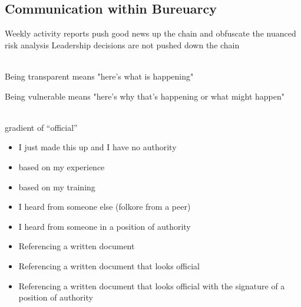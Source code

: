 \subsection{Communication within Bureuarcy}

Weekly activity reports push good news up the chain and obfuscate the nuanced risk analysis
Leadership decisions are not pushed down the chain

\ \\

Being transparent means "here's what is happening"

Being vulnerable means "here's why that's happening or what might happen"

\ \\

gradient of ``official''
\begin{itemize}
    \item I just made this up and I have no authority
    \item based on my experience
    \item based on my training
    \item I heard from someone else (folkore from a peer)
    \item I heard from someone in a position of authority
    \item Referencing a written document
    \item Referencing a written document that looks official
    \item Referencing a written document that looks official with the signature of a position of authority
\end{itemize}
